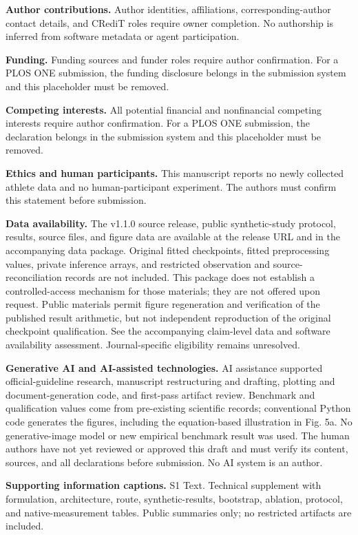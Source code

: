 \documentclass[12pt,a4paper]{article}
\begin{document}
\noindent\textbf{Author contributions.} Author identities, affiliations, corresponding-author contact details, and CRediT roles require owner completion. No authorship is inferred from software metadata or agent participation.

\medskip
\noindent\textbf{Funding.} Funding sources and funder roles require author confirmation. For a PLOS ONE submission, the funding disclosure belongs in the submission system and this placeholder must be removed.

\medskip
\noindent\textbf{Competing interests.} All potential financial and nonfinancial competing interests require author confirmation. For a PLOS ONE submission, the declaration belongs in the submission system and this placeholder must be removed.

\medskip
\noindent\textbf{Ethics and human participants.} This manuscript reports no newly collected athlete data and no human-participant experiment. The authors must confirm this statement before submission.

\medskip
\noindent\textbf{Data availability.} The v1.1.0 source release, public synthetic-study protocol, results, source files, and figure data are available at the release URL and in the accompanying data package. Original fitted checkpoints, fitted preprocessing values, private inference arrays, and restricted observation and source-reconciliation records are not included. This package does not establish a controlled-access mechanism for those materials; they are not offered upon request. Public materials permit figure regeneration and verification of the published result arithmetic, but not independent reproduction of the original checkpoint qualification. See the accompanying claim-level data and software availability assessment. Journal-specific eligibility remains unresolved.

\medskip
\noindent\textbf{Generative AI and AI-assisted technologies.} AI assistance supported official-guideline research, manuscript restructuring and drafting, plotting and document-generation code, and first-pass artifact review. Benchmark and qualification values come from pre-existing scientific records; conventional Python code generates the figures, including the equation-based illustration in Fig. 5a. No generative-image model or new empirical benchmark result was used. The human authors have not yet reviewed or approved this draft and must verify its content, sources, and all declarations before submission. No AI system is an author.

\ifdefined\ReviewEdition\else\footnotesize\setlength{\itemsep}{0pt}\fi



\ifdefined\ReviewEdition
\par\medskip
\noindent\textbf{Supporting information captions.} S1 Text. Technical supplement with formulation, architecture, route, synthetic-results, bootstrap, ablation, protocol, and native-measurement tables. Public summaries only; no restricted artifacts are included.
\fi
\end{document}
